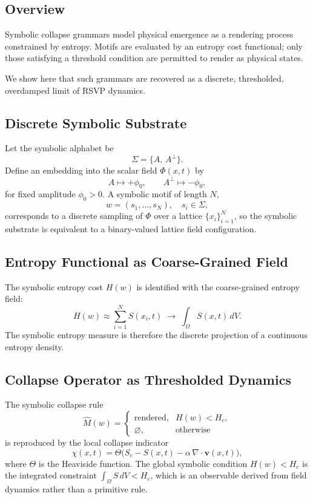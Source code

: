 \documentclass[12pt,a4paper]{article}
\theoremstyle{plain}
\theoremstyle{definition}
\theoremstyle{remark}
\begin{document}
\subsection{Overview}

Symbolic collapse grammars model physical emergence as a
rendering process constrained by entropy. Motifs are evaluated by
an entropy cost functional; only those satisfying a threshold
condition are permitted to render as physical states.

We show here that such grammars are recovered as a discrete,
thresholded, overdamped limit of RSVP dynamics.

\subsection{Discrete Symbolic Substrate}

Let the symbolic alphabet be
\[
\Sigma = \{A,\, A^\perp\}.
\]
Define an embedding into the scalar field $\Phi(x,t)$ by
\[
A \mapsto +\phi_0, \qquad A^\perp \mapsto -\phi_0,
\]
for fixed amplitude $\phi_0 > 0$. A symbolic motif of length $N$,
\[
w = (s_1,\dots,s_N), \quad s_i \in \Sigma,
\]
corresponds to a discrete sampling of $\Phi$ over a lattice
$\{x_i\}_{i=1}^N$, so the symbolic substrate is equivalent to a
binary-valued lattice field configuration.

\subsection{Entropy Functional as Coarse-Grained Field}

The symbolic entropy cost $H(w)$ is identified with the coarse-grained
entropy field:
\[
H(w) \approx \sum_{i=1}^N S(x_i,t)
\;\longrightarrow\;
\int_\Omega S(x,t)\, dV.
\]
The symbolic entropy measure is therefore the discrete projection of a
continuous entropy density.

\subsection{Collapse Operator as Thresholded Dynamics}

The symbolic collapse rule
\[
\hat{M}(w) =
\begin{cases}
\text{rendered}, & H(w) < H_c, \\
\varnothing, & \text{otherwise}
\end{cases}
\]
is reproduced by the local collapse indicator
\[
\chi(x,t) = \Theta\big(S_c - S(x,t) - \alpha\,\nabla\cdot\mathbf{v}(x,t)\big),
\]
where $\Theta$ is the Heaviside function. The global symbolic condition
$H(w) < H_c$ is the integrated constraint $\int_\Omega S\,dV < H_c$,
which is an observable derived from field dynamics rather than a
primitive rule.
\end{document}
